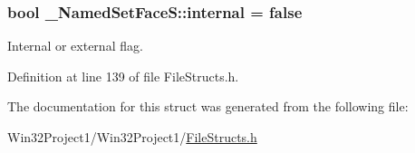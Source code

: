 \subsubsection[{\texorpdfstring{internal}{internal}}]{\setlength{\rightskip}{0pt plus 5cm}bool \+\_\+\+Named\+Set\+Face\+S\+::internal = false}\hypertarget{struct___named_set_face_s_ad89d075c31bb09b5d09a4f0ef1bcf3b1}{}\label{struct___named_set_face_s_ad89d075c31bb09b5d09a4f0ef1bcf3b1}


Internal or external flag. 



Definition at line 139 of file File\+Structs.\+h.



The documentation for this struct was generated from the following file\+:\begin{DoxyCompactItemize}
\item 
Win32\+Project1/\+Win32\+Project1/\hyperlink{_file_structs_8h}{File\+Structs.\+h}\end{DoxyCompactItemize}
